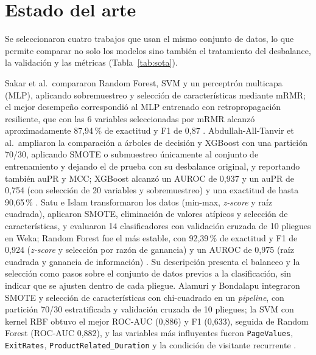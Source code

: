 \documentclass[conference]{IEEEtran}
\begin{document}
\section{Estado del arte}
\label{sec:sota}
Se seleccionaron cuatro trabajos que usan el mismo conjunto de datos, lo que permite comparar no solo los modelos sino también el tratamiento del desbalance, la validación y las métricas (Tabla~\ref{tab:sota}).

Sakar et al.\ compararon Random Forest, SVM y un perceptrón multicapa (MLP), aplicando sobremuestreo y selección de características mediante mRMR; el mejor desempeño correspondió al MLP entrenado con retropropagación resiliente, que con las 6 variables seleccionadas por mRMR alcanzó aproximadamente 87,94\,\% de exactitud y F1 de 0,87 \cite{sakar2019}. Abdullah-All-Tanvir et al.\ ampliaron la comparación a árboles de decisión y XGBoost con una partición 70/30, aplicando SMOTE o submuestreo únicamente al conjunto de entrenamiento y dejando el de prueba con su desbalance original, y reportando también auPR y MCC; XGBoost alcanzó un AUROC de 0,937 y un auPR de 0,754 (con selección de 20 variables y sobremuestreo) y una exactitud de hasta 90,65\,\% \cite{tanvir2023}. Satu e Islam transformaron los datos (min-max, \emph{z-score} y raíz cuadrada), aplicaron SMOTE, eliminación de valores atípicos y selección de características, y evaluaron 14 clasificadores con validación cruzada de 10 pliegues en Weka; Random Forest fue el más estable, con 92,39\,\% de exactitud y F1 de 0,924 (\emph{z-score} y selección por razón de ganancia) y un AUROC de 0,975 (raíz cuadrada y ganancia de información) \cite{satu2023}. Su descripción presenta el balanceo y la selección como pasos sobre el conjunto de datos previos a la clasificación, sin indicar que se ajusten dentro de cada pliegue. Alamuri y Bondalapu integraron SMOTE y selección de características con chi-cuadrado en un \emph{pipeline}, con partición 70/30 estratificada y validación cruzada de 10 pliegues; la SVM con kernel RBF obtuvo el mejor ROC-AUC (0,886) y F1 (0,633), seguida de Random Forest (ROC-AUC 0,882), y las variables más influyentes fueron \texttt{PageValues}, \texttt{ExitRates}, \texttt{ProductRelated\_Duration} y la condición de visitante recurrente \cite{alamuri2026}.
\end{document}
